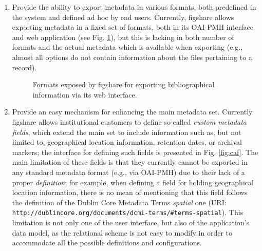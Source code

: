 \begin{enumerate}
\item Provide the ability to export metadata in various formats, both predefined in the system and defined ad hoc by end users. Currently, figshare allows exporting metadata in a fixed set of
formats, both in its OAI-PMH interface and web application (see Fig. \ref{fig:figexport}), but this is
lacking in both number of formats and the actual metadata which is available when exporting (e.g., almost all options do not contain information about the files pertaining to a record).

\begin{figure}[thpb]
  \centering
  \caption{Formats exposed by figshare for exporting bibliographical information via its web interface.}
  \label{fig:figexport}
\end{figure}

\item Provide an easy mechanism for enhancing the main metadata set. Currently figshare allows
institutional customers to define so-called \emph{custom metadata fields}, which extend the 
main set to include information such as, but not limited to, geographical
location information, retention dates, or archival markers; the interface for defining such fields
is presented in Fig. \ref{fig:caf}. The main limitation of these fields is that they currently
cannot be exported in any standard metadata format (e.g., via OAI-PMH) due to their lack of a
proper \emph{definition}; for example, when defining a field for holding geographical location
information, there is no mean of mentioning that this field follows the definition of the Dublin
Core Metadata Terms \emph{spatial} one (URI: \nolinkurl{http://dublincore.org/documents/dcmi-terms/#terms-spatial}). This limitation is not only one of the user interface, but also of the application's data model, as the relational scheme is not easy to modify in order to accommodate all the possible definitions and configurations.


\end{enumerate}
